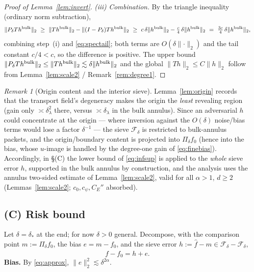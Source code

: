 \documentclass[11pt]{article}
\theoremstyle{remark}
\newtheorem{remark}[theorem]{Remark}
\newcommand{\F}{\mathcal{F}}
\newcommand{\norm}[1]{\lVert #1\rVert}
\begin{document}
\begin{proof}[Proof of Lemma~\ref{lem:invert}]
\smallskip
\noindent\emph{(iii) Combination.} By the triangle inequality (ordinary
norm subtraction),
\[
\norm{P_\delta Th^{\rm bulk}}_2
\ \ge\ \norm{Th^{\rm bulk}}_2-\norm{(I-P_\delta)Th^{\rm bulk}}_2
\ \ge\ c\,\delta\norm{h^{\rm bulk}}_2-\tfrac c4\,\delta
\norm{h^{\rm bulk}}_2
\ =\ \tfrac{3c}{4}\,\delta\norm{h^{\rm bulk}}_2 ,
\]
combining step~(i) and \eqref{eq:spectail}; both terms are
$O(\delta\norm{\cdot}_2)$ and the tail constant $c/4<c$, so the
difference is positive. The upper bound
$\norm{P_\delta Th^{\rm bulk}}_2\le\norm{Th^{\rm bulk}}_2
\lesssim\delta\norm{h^{\rm bulk}}_2$ and the global
$\norm{Th}_2\le C\norm{h}_2$ follow from Lemma~\ref{lem:scale2} /
Remark~\ref{rem:degree1}.
\end{proof}

\begin{remark}[Origin content and the interior sieve]\label{rem:modewise}
Lemma~\ref{lem:origin} records that the transport field's degeneracy makes
the origin the \emph{least} revealing region (gain only
$\asymp\delta_\lambda^{2}$ there, versus $\asymp\delta_\lambda$ in the bulk
annulus). Since an adversarial $h$ could concentrate at the origin ---
where inversion against the $O(\delta)$ noise/bias terms would lose a
factor $\delta^{-1}$ --- the sieve $\F_\delta$ is restricted to
bulk-annulus packets, and the origin/boundary content is projected into
$\Pi_\delta f_0$ (hence into the bias, whose $u$-image is handled by the
degree-one gain of \eqref{eq:finebias}). Accordingly, in \S(C) the lower
bound of \eqref{eq:infsup} is applied to the \emph{whole} sieve error $h$,
supported in the bulk annulus by construction, and the analysis uses the
annulus two-sided estimate of Lemma~\ref{lem:scale2}, valid for all
$\alpha>1$, $d\ge2$ (Lemmas~\ref{lem:scale2}; $c_0,c_\psi,C_E''$
absorbed).
\end{remark}


\subsection{(C) Risk bound}
Let $\delta=\delta_*$ at the end; for now $\delta>0$ general. Decompose,
with the comparison point $m:=\Pi_\delta f_0$, the bias $e=m-f_0$, and the
sieve error $h:=\widehat f-m\in\F_\delta-\F_\delta$,
\[
\widehat f-f_0=h+e .
\]
\textbf{Bias.} By \eqref{eq:approx}, $\norm{e}_2^{2}\lesssim\delta^{2\alpha}$.
\end{document}
